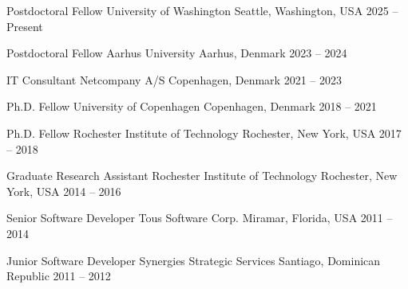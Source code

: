 

\begin{cventries}
  \cventry
    {Postdoctoral Fellow}
    {University of Washington}
    {Seattle, Washington, USA}
    {2025 -- Present}
    {}
    
  \cventry
    {Postdoctoral Fellow}
    {Aarhus University}
    {Aarhus, Denmark}
    {2023 -- 2024}
    {}

  \cventry
    {IT Consultant}
    {Netcompany A/S}
    {Copenhagen, Denmark}
    {2021 -- 2023}
    {}

  \cventry
    {Ph.D. Fellow}
    {University of Copenhagen}
    {Copenhagen, Denmark}
    {2018 -- 2021}
    {}

  \cventry
    {Ph.D. Fellow}
    {Rochester Institute of Technology}
    {Rochester, New York, USA}
    {2017 -- 2018}
    {}

  \cventry
    {Graduate Research Assistant}
    {Rochester Institute of Technology}
    {Rochester, New York, USA}
    {2014 -- 2016}
    {}

  \cventry
    {Senior Software Developer}
    {Tous Software Corp.}
    {Miramar, Florida, USA}
    {2011 -- 2014}
    {}

  \cventry
    {Junior Software Developer}
    {Synergies Strategic Services}
    {Santiago, Dominican Republic}
    {2011 -- 2012}
    {}
	
\end{cventries}
